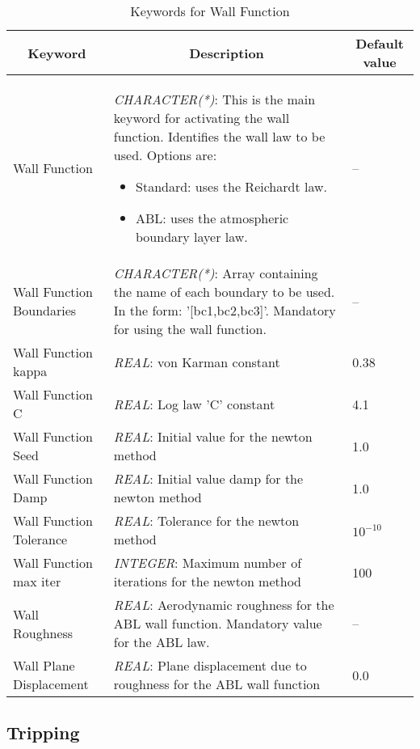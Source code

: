 \documentclass[a4paper,10pt]{report}
\begin{document}
\begin{table}[htbp]
\caption{Keywords for Wall Function}
\begin{tabular}{|l|p{10cm}|p{2.2cm}|}
\hline
\multicolumn{1}{|c|}{Keyword} & \multicolumn{1}{c|}{Description} & \multicolumn{1}{c|}{Default value} \\ \hline

Wall Function					& \textit{CHARACTER(*)}: This is the main keyword for activating the wall function. Identifies the wall law to be used. Options are:
    \begin{itemize}
    \item Standard: uses the Reichardt law.
    \item ABL: uses the atmospheric boundary layer law.
    \end{itemize}
& -- \\ \hline

Wall Function Boundaries 	    & \textit{CHARACTER(*)}: Array containing the name of each boundary to be used. In the form: '[bc1,bc2,bc3]'. Mandatory for using the wall function. & -- \\ \hline

Wall Function kappa		    	& \textit{REAL}: von Karman constant  & 0.38 \\ \hline
Wall Function C     			& \textit{REAL}: Log law 'C' constant  & 4.1 \\ \hline
Wall Function Seed		    	& \textit{REAL}: Initial value for the newton method  & 1.0 \\ \hline
Wall Function Damp		    	& \textit{REAL}: Initial value damp for the newton method & 1.0 \\ \hline
Wall Function Tolerance			& \textit{REAL}: Tolerance for the newton method  & $10^{-10}$ \\ \hline
Wall Function max iter			& \textit{INTEGER}: Maximum number of iterations for the newton method  & 100 \\ \hline
Wall Roughness	        		& \textit{REAL}: Aerodynamic roughness for the ABL wall function. Mandatory value for the ABL law.  & -- \\ \hline
Wall Plane Displacement			& \textit{REAL}: Plane displacement due to roughness for the ABL wall function  & 0.0 \\ \hline


\end{tabular}
\label{tab:wallFunckey}
\end{table}

\subsection{Tripping}
\end{document}
